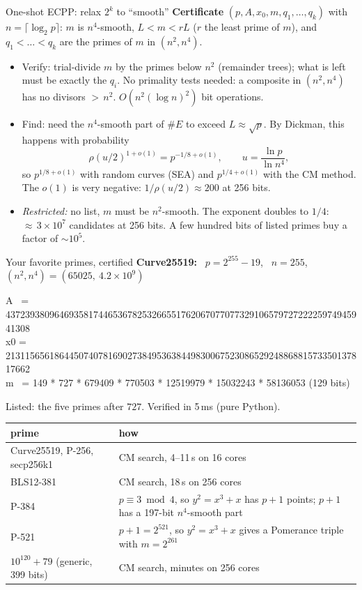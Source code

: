 \documentclass[aspectratio=169,11pt]{beamer}
\newcommand{\find}[1]{{\color{fred}#1}}
\newcommand{\ver}[1]{{\color{vblue}#1}}
\begin{document}
\begin{frame}{One-shot ECPP: relax $2^k$ to ``smooth''}
\textbf{Certificate} $(p, A, x_0, m, q_1,\dots,q_k)$ with $n = \lceil\log_2 p\rceil$:
$m$ is $n^4$-smooth, $L < m < rL$ ($r$ the least prime of $m$), and $q_1<\dots<q_k$ are the
primes of $m$ in $(n^2, n^4)$.
\begin{itemize}
\item \ver{Verify:} trial-divide $m$ by the primes below $n^2$ (remainder trees); what is left must be
exactly the $q_i$.  No primality tests needed: a composite in $(n^2, n^4)$ has no divisors
${>}\,n^2$.  \ver{$O(n^2(\log n)^2)$} bit operations.
\item \find{Find:} need the $n^4$-smooth part of $\#E$ to exceed $L\approx\sqrt p$.  By Dickman, this
happens with probability
\[
\rho(u/2)^{1+o(1)} = p^{-1/8+o(1)}, \qquad u = \frac{\ln p}{\ln n^4},
\]
so \find{$p^{1/8+o(1)}$} with random curves (SEA) and \find{$p^{1/4+o(1)}$} with the CM method.
The $o(1)$ is very negative: $1/\rho(u/2)\approx 200$ at 256 bits.
\item \emph{Restricted:} no list, $m$ must be $n^2$-smooth.  The exponent doubles to $1/4$:
${\approx}\,3\times10^7$ candidates at 256 bits.  A few hundred bits of listed primes
buy a factor of ${\sim}10^5$.
\end{itemize}
\end{frame}

\begin{frame}{Your favorite primes, certified}
\textbf{Curve25519:} \ $p = 2^{255}-19$, \ $n = 255$, \ $(n^2, n^4) = (65025,\ 4.2\times10^{9})$
\smallskip

{\footnotesize\ttfamily
A \ = 43723938096469358174465367825326655176206707707732910657972722225974945941308\\
x0 = 21311565618644507407816902738495363844983006752308652924886881573350137817662\\
m \ = 149 * 727 * 679409 * 770503 * 12519979 * 15032243 * 58136053 \quad\rmfamily(129 bits)\par}
\smallskip
Listed: the five primes after $727$.  Verified in 5\,ms (pure Python).
\medskip
\begin{center}\footnotesize
\begin{tabular}{@{}lp{}@{}}
\toprule
prime & how\\
\midrule
Curve25519, P-256, secp256k1 & CM search, 4--11\,s on 16 cores\\
BLS12-381 & CM search, 18\,s on 256 cores\\
P-384 & $p\equiv 3 \bmod 4$, so $y^2 = x^3+x$ has $p+1$ points; $p+1$ has a 197-bit $n^4$-smooth part\\
P-521 & $p+1 = 2^{521}$, so $y^2 = x^3+x$ gives a Pomerance triple with $m = 2^{261}$\\
\midrule
$10^{120}+79$ (generic, 399 bits) & CM search, minutes on 256 cores\\
\bottomrule
\end{tabular}
\end{center}
\end{frame}
\end{document}

